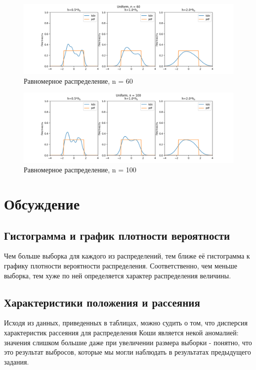 \documentclass[12pt]{article}
\begin{document}
\begin{figure}
  \centering
  \includegraphics[width=0.8\paperwidth ]{images/kde/Uniform_60.png}
  \caption{Равномерное распределение, n = 60}
\end{figure}

\begin{figure}[!ht]
  \centering
  \includegraphics[width=0.8\paperwidth ]{images/kde/Uniform_100.png}
  \caption{Равномерное распределение, n = 100}
\end{figure}


\FloatBarrier
\section{Обсуждение}
\subsection{Гистограмма и график плотности вероятности}
Чем больше выборка для каждого из распределений, тем ближе
её гистограмма к графику плотности вероятности распределения. Соответственно,
чем меньше выборка, тем хуже по ней определяется характер распределения
величины.


\subsection{Характеристики положения и рассеяния}
Исходя из данных, приведенных в таблицах, можно судить о том,
что дисперсия характеристик рассеяния для распределения Коши
является некой аномалией: значения слишком большие даже при
увеличении размера выборки - понятно, что это результат выбросов, 
которые мы могли наблюдать в результатах предыдущего задания.
\end{document}
